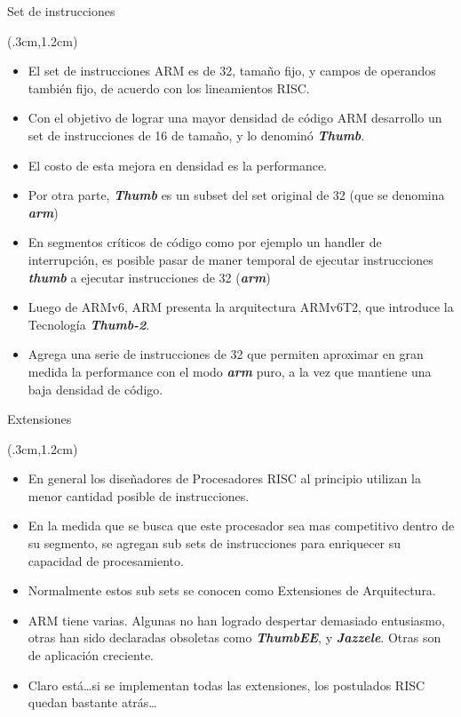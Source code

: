 \documentclass[usenames,table,dvipsnames,aspectratio=169]{beamer}
\begin{document}
\begin{frame}{Set de instrucciones}
 \begin{textblock*}{\textwidth}(.3cm,1.2cm)
  \begin{itemize}[<+(1)->]\justifying %
   \item El set de instrucciones ARM es de \SI{32}{\bit}, tamaño fijo, y campos de operandos también fijo, de acuerdo con los lineamientos RISC.
   \item Con el objetivo de lograr una mayor densidad de código ARM desarrollo un set de instrucciones de \SI{16}{\bit} de tamaño, y lo denominó \textbf{\textit{Thumb}}.
   \item El costo de esta mejora en densidad es la performance.
   \item Por otra parte, \textbf{\textit{Thumb}} es un subset del set original de \SI{32}{\bit} (que se denomina \textbf{\textit{arm}})
   \item En segmentos críticos de código como por ejemplo un handler de interrupción, es posible pasar de maner temporal de ejecutar instrucciones \textbf{\textit{thumb}} a ejecutar instrucciones de \SI{32}{\bit} (\textit{\textbf{arm}})
   \item Luego de ARMv6, ARM presenta la arquitectura ARMv6T2, que introduce la Tecnología \textit{\textbf{Thumb-2}}.
   \item Agrega una serie de instrucciones de \SI{32}{\bit} que permiten aproximar en gran medida la performance con el modo \textbf{\textit{arm}} puro, a la vez que mantiene una baja densidad de código.
  \end{itemize}
 \end{textblock*}
\end{frame}

\begin{frame}{Extensiones}
 \begin{textblock*}{\textwidth}(.3cm,1.2cm)
  \begin{itemize}[<+(1)->]\justifying \parskip 0.3cm
   \item En general los diseñadores de Procesadores RISC al principio utilizan la menor cantidad posible de instrucciones.
   \item En la medida que se busca que este procesador sea mas competitivo dentro de su segmento, se agregan sub sets de instrucciones para enriquecer su capacidad de procesamiento.
   \item Normalmente estos sub sets se conocen como Extensiones de Arquitectura. 
   \item ARM tiene varias. Algunas no han logrado despertar demasiado entusiasmo, otras han sido declaradas obsoletas como \textbf{\textit{ThumbEE}}, y \textbf{\textit{Jazzele}}. Otras son de aplicación creciente.
   \item Claro está\dots si se implementan todas las extensiones, los postulados RISC quedan bastante atrás\dots
  \end{itemize}
 \end{textblock*}
\end{frame}
\end{document}
